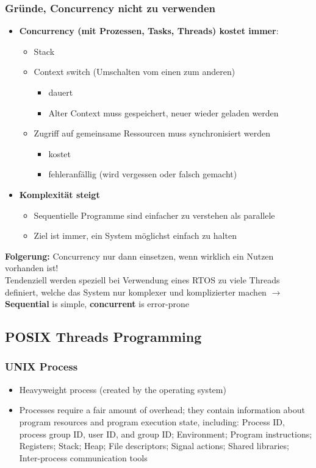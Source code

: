 \subsubsection{Gründe, Concurrency nicht zu verwenden}
\begin{itemize}
  \item \textbf{Concurrency (mit Prozessen, Tasks, Threads) kostet immer}:
  \begin{itemize}
  	\item Stack
  	\item Context switch (Umschalten vom einen zum anderen)
  	  \begin{itemize}
  	  \item dauert
  	  \item Alter Context muss gespeichert, neuer wieder geladen werden
  	  \end{itemize}
  	\item Zugriff auf gemeinsame Ressourcen muss synchronisiert werden
  	  \begin{itemize}
  	  \item kostet
  	  \item fehleranfällig (wird vergessen oder falsch gemacht)
  	  \end{itemize}
  \end{itemize}
\item \textbf{Komplexität steigt}
  \begin{itemize}
  \item Sequentielle Programme sind einfacher zu verstehen als parallele
  \item Ziel ist immer, ein System möglichst einfach zu halten
  \end{itemize}
\end{itemize}

\textbf{Folgerung:} Concurrency nur dann einsetzen, wenn wirklich ein Nutzen vorhanden ist!\\
Tendenziell werden speziell bei Verwendung eines RTOS zu viele Threads definiert, welche das System nur komplexer und komplizierter machen $\rightarrow$ \textbf{Sequential} is simple, \textbf{concurrent} is error-prone

\subsection{POSIX Threads Programming}
\subsubsection{UNIX Process}
\begin{itemize}
  \item Heavyweight process (created by the operating system)
  \item Processes require a fair amount of overhead; they contain information about program resources and program execution state, including: Process ID, process group ID, user ID, and group ID; Environment; Program instructions; Registers; Stack; Heap; File descriptors; Signal actions; Shared libraries; Inter-process communication tools
\end{itemize}

